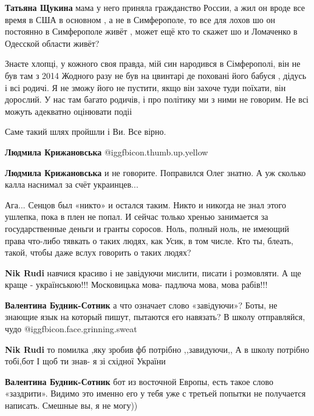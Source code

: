 \begin{itemize}
\begin{itemize}
\textbf{Татьяна Щукина} мама у него приняла гражданство России, а жил он вроде все время в США в основном , а не в Симферополе, то все для лохов шо он постоянно в Симферополе живёт , может ещё кто то скажет шо и Ломаченко в Одесской области живёт?


Знаєте хлопці, у кожного своя правда, мій син народився в Сімферополі, він не
був там з 2014 Жодного разу не був на цвинтарі де поховані його бабуся , дідусь
і всі родичі. Я не зможу його не пустити, якщо він захоче туди поїхати, він
дорослий. У нас там багато родичів, і про політику ми з ними не говорим. Не всі
можуть адекватно оцінювати подіі

\end{itemize} %

Саме такий шлях пройшли і Ви. Все вірно.

\begin{itemize} %
\textbf{Людмила Крижановська}  @igg{fbicon.thumb.up.yellow} 

\textbf{Людмила Крижановська} и не говорите. Поправился Олег знатно. А уж сколько калла наснимал за счёт украинцев...


Ага... Сенцов был «никто» и остался таким. Никто и никогда не знал этого ушлепка,
пока в плен не попал. И сейчас только хренью занимается за государственные
деньги и гранты соросов. Ноль, полный ноль, не имеющий права что-либо тявкать о
таких людях, как Усик, в том числе. Кто ты, блеать, такой, чтобы даже вслух
говорить о таких людях?

\textbf{Nik Rudi} навчися красиво і не завідуючи мислити, писати і розмовляти.
А ще краще - українською!!! Московицька мова- падлюча мова, мова рабів!!!

\textbf{Валентина Будник-Сотник} а что означает слово «завiдуючи»? Боты, не знающие язык на который пишут, пытаются его навязать? В школу отправляйся, чудо @igg{fbicon.face.grinning.sweat} 

\textbf{Nik Rudi} то помилка ,яку зробив фб потрібно ,,завидуючи,,
А в школу потрібно тобі,бот
І щоб ти знав- я зі східної України

\textbf{Валентина Будник-Сотник} бот из восточной Европы, есть такое слово «заздрити». Видимо это именно его у тебя уже с третьей попытки не получается написать. Смешные вы, я не могу))


\end{itemize}
\end{itemize}
